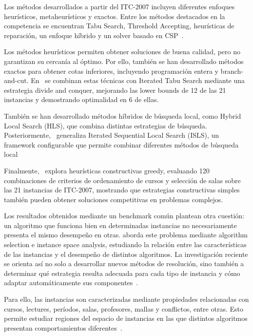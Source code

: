 \documentclass[letter, 10pt]{article}
\begin{document}
Los m\'etodos desarrollados a partir del ITC-2007 incluyen diferentes enfoques heur\'isticos, metaheur\'isticos y exactos. Entre los m\'etodos destacados en la competencia se encuentran Tabu Search, Threshold Accepting, heur\'isticas de reparaci\'on, un enfoque h\'ibrido y un solver basado en CSP~\cite{Ceschia2023Educational}.

Los m\'etodos heur\'isticos permiten obtener soluciones de buena calidad, pero no garantizan su cercan\'ia al \'optimo. Por ello, tambi\'en se han desarrollado m\'etodos exactos para obtener cotas inferiores, incluyendo programaci\'on entera y branch-and-cut. En~\cite{Hao2011LowerBounds} se combinan estas t\'ecnicas con Iterated Tabu Search mediante una estrategia divide and conquer, mejorando las lower bounds de 12 de las 21 instancias y demostrando optimalidad en 6 de ellas.

Tambi\'en se han desarrollado m\'etodos h\'ibridos de b\'usqueda local, como Hybrid Local Search (HLS), que combina distintas estrategias de b\'usqueda. Posteriormente,~\cite{Feutrier2023Landscape} generaliza Iterated Sequential Local Search (ISLS), un framework configurable que permite combinar diferentes m\'etodos de b\'usqueda local

Finalmente,~\cite{Cosar2022Greedy} explora heur\'isticas constructivas greedy, evaluando 120 combinaciones de criterios de ordenamiento de cursos y selecci\'on de salas sobre las 21 instancias de ITC-2007, mostrando que estrategias constructivas simples tambi\'en pueden obtener soluciones competitivas en problemas complejos.

Los resultados obtenidos mediante un benchmark com\'un plantean otra cuesti\'on: un algoritmo que funciona bien en determinadas instancias no necesariamente presenta el mismo desempe\~no en otras. \cite{DeCoster2022AlgorithmSelection} aborda este problema mediante algorithm selection e instance space analysis, estudiando la relaci\'on entre las caracter\'isticas de las instancias y el desempe\~no de distintos algoritmos. La investigaci\'on reciente se orienta as\'i no solo a desarrollar nuevos m\'etodos de resoluci\'on, sino tambi\'en a determinar qu\'e estrategia resulta adecuada para cada tipo de instancia y c\'omo adaptar autom\'aticamente sus componentes~\cite{Feutrier2023Landscape,DeCoster2022AlgorithmSelection}.

Para ello, las instancias son caracterizadas mediante propiedades relacionadas con cursos, lectures, per\'iodos, salas, profesores, mallas y conflictos, entre otras. Esto permite estudiar regiones del espacio de instancias en las que distintos algoritmos presentan comportamientos diferentes~\cite{DeCoster2022AlgorithmSelection}.
\end{document}

